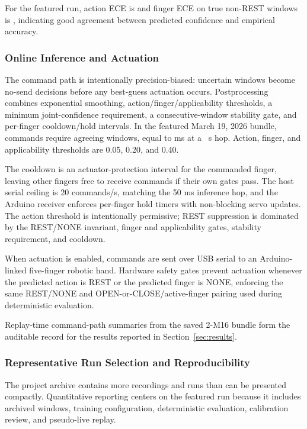 \documentclass[conference]{IEEEtran}
\begin{document}
For the featured run, action ECE is \FeaturedActionECE{} and finger ECE on true non-REST windows is \FeaturedFingerECE{}, indicating good agreement between predicted confidence and empirical accuracy.

\subsubsection{Online Inference and Actuation}
The command path is intentionally precision-biased: uncertain windows become no-send decisions before any best-guess actuation occurs. Postprocessing combines exponential smoothing, action/finger/applicability thresholds, a minimum joint-confidence requirement, a consecutive-window stability gate, and per-finger cooldown/hold intervals. In the featured March 19, 2026 bundle, commands require \FeaturedActuationStabilityWindows{} agreeing windows, equal to \FeaturedActuationStabilityMs{} ms at a \HopSec~s hop. Action, finger, and applicability thresholds are 0.05, 0.20, and 0.40.

The cooldown is an actuator-protection interval for the commanded finger, leaving other fingers free to receive commands if their own gates pass. The host serial ceiling is 20 commands/s, matching the 50 ms inference hop, and the Arduino receiver enforces per-finger hold timers with non-blocking servo updates. The action threshold is intentionally permissive; REST suppression is dominated by the REST/NONE invariant, finger and applicability gates, stability requirement, and cooldown.

When actuation is enabled, commands are sent over USB serial to an Arduino-linked five-finger robotic hand. Hardware safety gates prevent actuation whenever the predicted action is REST or the predicted finger is NONE, enforcing the same REST/NONE and OPEN-or-CLOSE/active-finger pairing used during deterministic evaluation.

Replay-time command-path summaries from the saved 2-M16 bundle form the auditable record for the results reported in Section~\ref{sec:results}.

\subsubsection{Representative Run Selection and Reproducibility}
The project archive contains more recordings and runs than can be presented compactly. Quantitative reporting centers on the featured run because it includes archived windows, training configuration, deterministic evaluation, calibration review, and pseudo-live replay.
\end{document}
